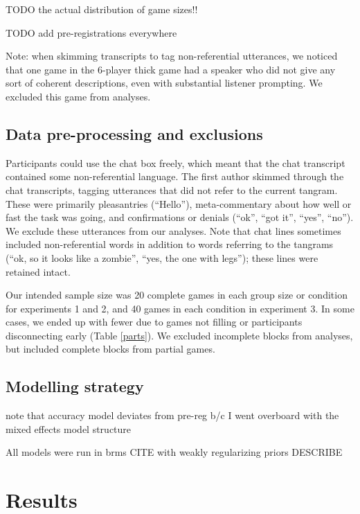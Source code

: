 \documentclass[
  english,
  a4paper,
]{article}
\begin{document}
TODO the actual distribution of game sizes!!

TODO add pre-registrations everywhere

Note: when skimming transcripts to tag non-referential utterances, we noticed that one game in the 6-player thick game had a speaker who did not give any sort of coherent descriptions, even with substantial listener prompting. We excluded this game from analyses.

\hypertarget{data-pre-processing-and-exclusions}{%
\subsection{Data pre-processing and exclusions}\label{data-pre-processing-and-exclusions}}

Participants could use the chat box freely, which meant that the chat transcript contained some non-referential language. The first author skimmed through the chat transcripts, tagging utterances that did not refer to the current tangram. These were primarily pleasantries (``Hello''), meta-commentary about how well or fast the task was going, and confirmations or denials (``ok'', ``got it'', ``yes'', ``no''). We exclude these utterances from our analyses. Note that chat lines sometimes included non-referential words in addition to words referring to the tangrams (``ok, so it looks like a zombie'', ``yes, the one with legs''); these lines were retained intact.

Our intended sample size was 20 complete games in each group size or condition for experiments 1 and 2, and 40 games in each condition in experiment 3. In some cases, we ended up with fewer due to games not filling or participants disconnecting early (Table \ref{parts}). We excluded incomplete blocks from analyses, but included complete blocks from partial games.

\hypertarget{modelling-strategy}{%
\subsection{Modelling strategy}\label{modelling-strategy}}

note that accuracy model deviates from pre-reg b/c I went overboard with the mixed effects model structure

All models were run in brms CITE with weakly regularizing priors DESCRIBE

\hypertarget{results}{%
\section{Results}\label{results}}
\end{document}
